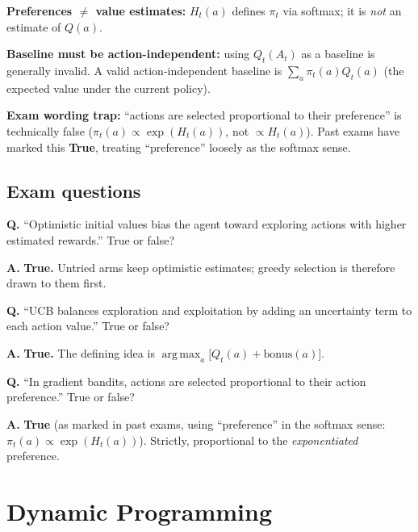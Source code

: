 \documentclass[11pt, oneside]{book}
\newcommand{\argmax}{\operatorname*{arg\,max}}
\begin{document}
\begin{notebox}[title={Key Distinctions}]
\textbf{Preferences $\ne$ value estimates:} $H_t(a)$ defines $\pi_t$ via
softmax; it is \emph{not} an estimate of $Q(a)$.

\textbf{Baseline must be action-independent:} using $Q_t(A_t)$ as a baseline
is generally invalid. A valid action-independent baseline is
$\sum_a \pi_t(a) Q_t(a)$ (the expected value under the current policy).

\textbf{Exam wording trap:} ``actions are selected proportional to their
preference'' is technically false ($\pi_t(a) \propto \exp(H_t(a))$, not
$\propto H_t(a)$). Past exams have marked this \textbf{True}, treating
``preference'' loosely as the softmax sense.
\end{notebox}

\section{Exam questions}

\begin{exbox}[title={Exam: Optimistic Initialization}]
\textbf{Q.} ``Optimistic initial values bias the agent toward exploring
actions with higher estimated rewards.'' True or false?

\medskip
\textbf{A.} \textbf{True.} Untried arms keep optimistic estimates; greedy
selection is therefore drawn to them first.
\end{exbox}

\begin{exbox}[title={Exam: UCB}]
\textbf{Q.} ``UCB balances exploration and exploitation by adding an
uncertainty term to each action value.'' True or false?

\medskip
\textbf{A.} \textbf{True.} The defining idea is
$\argmax_a\bigl[Q_t(a) + \text{bonus}(a)\bigr]$.
\end{exbox}

\begin{exbox}[title={Exam: Gradient Bandits}]
\textbf{Q.} ``In gradient bandits, actions are selected proportional to their
action preference.'' True or false?

\medskip
\textbf{A.} \textbf{True} (as marked in past exams, using ``preference'' in
the softmax sense: $\pi_t(a) \propto \exp(H_t(a))$). Strictly, proportional
to the \emph{exponentiated} preference.
\end{exbox}


\chapter{Dynamic Programming}
\end{document}
